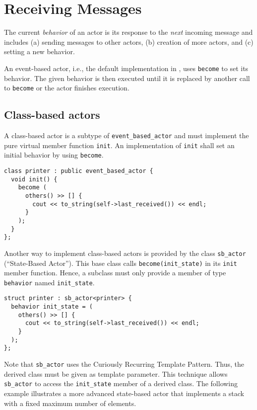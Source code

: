 \section{Receiving Messages}
\label{Sec::Receive}

The current \textit{behavior} of an actor is its response to the \textit{next} incoming message and includes (a) sending messages to other actors, (b) creation of more actors, and (c) setting a new behavior.

An event-based actor, i.e., the default implementation in \libcppa, uses \lstinline^become^ to set its behavior.
The given behavior is then executed until it is replaced by another call to \lstinline^become^ or the actor finishes execution.

\subsection{Class-based actors}

A class-based actor is a subtype of \lstinline^event_based_actor^ and must implement the pure virtual member function \lstinline^init^.
An implementation of \lstinline^init^ shall set an initial behavior by using \lstinline^become^.

\begin{lstlisting}
class printer : public event_based_actor {
  void init() {
    become (
      others() >> [] {
        cout << to_string(self->last_received()) << endl;
      }
    );
  }
};
\end{lstlisting}

Another way to implement class-based actors is provided by the class \lstinline^sb_actor^ (``State-Based Actor'').
This base class calls \lstinline^become(init_state)^ in its \lstinline^init^ member function.
Hence, a subclass must only provide a member of type \lstinline^behavior^ named \lstinline^init_state^.

\begin{lstlisting}
struct printer : sb_actor<printer> {
  behavior init_state = (
    others() >> [] {
      cout << to_string(self->last_received()) << endl;
    }
  );
};
\end{lstlisting}

Note that \lstinline^sb_actor^ uses the Curiously Recurring Template Pattern. Thus, the derived class must be given as template parameter.
This technique allows \lstinline^sb_actor^ to access the \lstinline^init_state^ member of a derived class.
The following example illustrates a more advanced state-based actor that implements a stack with a fixed maximum number of elements.


